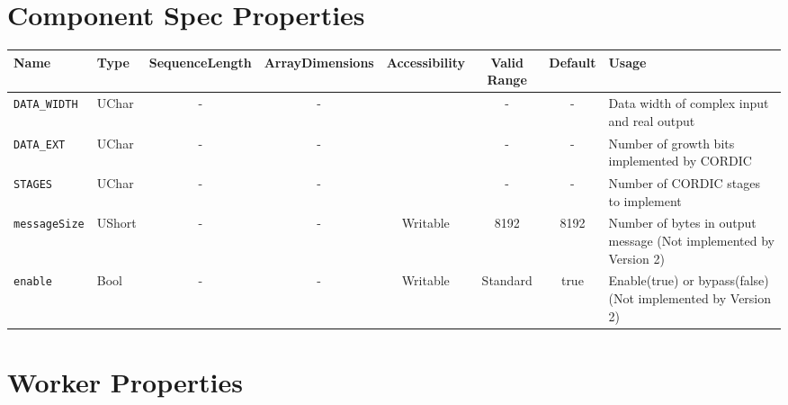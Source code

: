 \begin{landscape}
\section*{Component Spec Properties}
	\begin{scriptsize}
		\begin{longtable}{|p{3cm}|p{1.5cm}|c|c|c|c|c|p{7cm}|}
			\hline
			\rowcolor{blue}
			Name               & Type   & SequenceLength & ArrayDimensions & Accessibility      & Valid Range & Default & Usage                                        \\
			\hline
			\verb+DATA_WIDTH+  & UChar  & -              & -               & & -           & -       & Data width of complex input and real output \\
			\hline
			\verb+DATA_EXT+    & UChar  & -              & -               & & -           & -       & Number of growth bits implemented by CORDIC  \\
			\hline
			\verb+STAGES+      & UChar  & -              & -               & & -           & -       & Number of CORDIC stages to implement          \\
			\hline
			\verb+messageSize+ & UShort & -              & -               & Writable & 8192        & 8192    & Number of bytes in output message (Not implemented by Version 2) \\
			\hline
			\verb+enable+      & Bool   & -              & -               & Writable & Standard    & true    & Enable(true) or bypass(false)                                      (Not implemented by Version 2) \\
			\hline
		\end{longtable}
	\end{scriptsize}

	\section*{Worker Properties}

\end{landscape}
